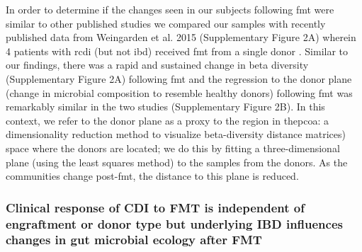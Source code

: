 In order to determine if the changes seen in our subjects following \gls{fmt} were similar to other published studies we compared our samples with recently published data from Weingarden et al. 2015 (Supplementary Figure 2A) wherein 4 patients with \gls{rcdi} (but not \gls{ibd}) received \gls{fmt} from a single donor \cite{RN1471}. Similar to our findings, there was a rapid and sustained change in beta diversity (Supplementary Figure 2A) following \gls{fmt} and the regression to the donor plane (change in microbial composition to resemble healthy donors) following \gls{fmt} was remarkably similar in the two studies (Supplementary Figure 2B). In this context, we refer to the donor plane as a proxy to the region in the\gls{pcoa}: a dimensionality reduction method to visualize beta-diversity distance matrices) space where the donors are located; we do this by fitting a three-dimensional plane (using the least squares method) to the samples from the donors. As the communities change post-\gls{fmt}, the distance to this plane is reduced.

\subsubsection{Clinical response of CDI to FMT is independent of engraftment or donor type but underlying IBD influences changes in gut microbial ecology after FMT}

